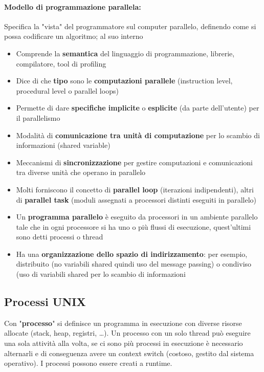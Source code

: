 \paragraph{Modello di programmazione parallela:} Specifica la "vista" del programmatore sul computer parallelo, definendo come si possa codificare un algoritmo; al suo interno
\begin{itemize}
	\item Comprende la \textbf{semantica} del linguaggio di programmazione, librerie, compilatore, tool di profiling
	
	\item Dice di che \textbf{tipo} sono le \textbf{computazioni parallele} (instruction level, procedural level o parallel loops)
	
	\item Permette di dare \textbf{specifiche implicite} o \textbf{esplicite} (da parte dell'utente) per il parallelismo
	
	\item Modalità di \textbf{comunicazione tra unità di computazione} per lo scambio di informazioni (shared variable)
	
	\item Meccanismi di \textbf{sincronizzazione} per gestire computazioni e comunicazioni tra diverse unità che operano in parallelo
	
	\item Molti forniscono il concetto di \textbf{parallel loop} (iterazioni indipendenti), altri di \textbf{parallel task} (moduli assegnati a processori distinti eseguiti in parallelo)
	
	\item Un \textbf{programma parallelo} è eseguito da processori in un ambiente parallelo tale che in ogni processore si ha uno o più flussi di esecuzione, quest'ultimi sono detti processi o thread
	
	\item Ha una \textbf{organizzazione dello spazio di indirizzamento}: per esempio, distribuito (no variabili shared quindi uso del message passing) o condiviso (uso di variabili shared per lo scambio di informazioni
\end{itemize}

\subsection{Processi UNIX}

Con "\textbf{processo}" si definisce un programma in esecuzione con diverse risorse allocate (stack, heap, registri, \dots). Un processo con un solo thread può eseguire una sola attività alla volta, se ci sono più processi in esecuzione è necessario alternarli e di conseguenza avere un context switch (costoso, gestito dal sistema operativo). I processi possono essere creati a runtime.


